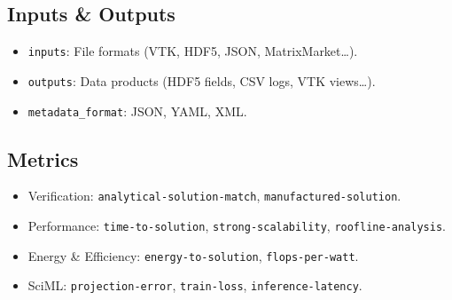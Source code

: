 \subsection{Inputs \& Outputs}
\begin{itemize}
  \item \texttt{inputs}: File formats (VTK, HDF5, JSON, MatrixMarket…).  
  \item \texttt{outputs}: Data products (HDF5 fields, CSV logs, VTK views…).  
  \item \texttt{metadata\_format}: JSON, YAML, XML.
\end{itemize}

\subsection{Metrics}
\begin{itemize}
  \item Verification: \texttt{analytical-solution-match}, \texttt{manufactured-solution}.  
  \item Performance: \texttt{time-to-solution}, \texttt{strong-scalability}, \texttt{roofline-analysis}.  
  \item Energy \& Efficiency: \texttt{energy-to-solution}, \texttt{flops-per-watt}.  
  \item SciML: \texttt{projection-error}, \texttt{train-loss}, \texttt{inference-latency}.
\end{itemize}

